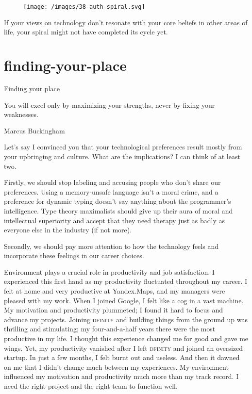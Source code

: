 \documentclass{article}
\begin{document}
\begin{figure}[medium-size,grayscale-diagram]
\texttt{[image: /images/38-auth-spiral.svg]}
\end{figure}

If your views on technology don't resonate with your core beliefs in other areas of life,
your spiral might not have completed its cycle yet.

\section{finding-your-place}{Finding your place}

\epigraph{
You will excel only by maximizing your strengths, never by fixing your weaknesses.
}{Marcus Buckingham}

Let's say I convinced you that your technological preferences result mostly from your upbringing and culture.
What are the implications? I can think of at least two.

Firstly, we should stop labeling and accusing people who don't share our preferences.
Using a memory-unsafe language isn't a moral crime, and a preference for dynamic typing doesn't say anything about the programmer's intelligence.
Type theory maximalists should give up their aura of moral and intellectual superiority and accept that they need therapy just as badly as everyone else in the industry (if not more).

\begin{figure}[medium-size]
\end{figure}

Secondly, we should pay more attention to how the technology feels and incorporate these feelings in our career choices.

Environment plays a crucial role in productivity and job satisfaction.
I experienced this first hand as my productivity fluctuated throughout my career.
I felt at home and very productive at Yandex.Maps, and my managers were pleased with my work.
When I joined Google, I felt like a cog in a vast machine.
My motivation and productivity plummeted; I found it hard to focus and advance my projects.
Joining \textsc{dfinity} and building things from the ground up was thrilling and stimulating; my four-and-a-half years there were the most productive in my life.
I thought this experience changed me for good and gave me wings.
Yet, my productivity vanished after I left \textsc{dfinity} and joined an oversized startup.
In just a few months, I felt burnt out and useless.
And then it dawned on me that I didn't change much between my experiences.
My environment influenced my motivation and productivity much more than my track record.
I need the right project and the right team to function well.
\end{document}

